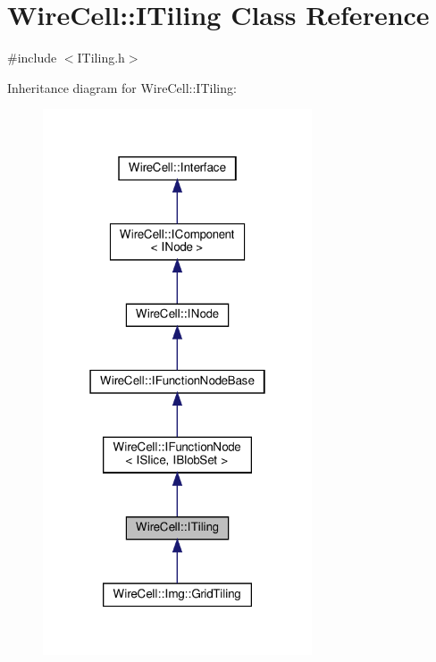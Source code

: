 \hypertarget{class_wire_cell_1_1_i_tiling}{}\section{Wire\+Cell\+:\+:I\+Tiling Class Reference}
\label{class_wire_cell_1_1_i_tiling}


{\ttfamily \#include $<$I\+Tiling.\+h$>$}



Inheritance diagram for Wire\+Cell\+:\+:I\+Tiling\+:
\nopagebreak
\begin{figure}[H]
\begin{center}
\leavevmode
\includegraphics[width=226pt]{class_wire_cell_1_1_i_tiling__inherit__graph}
\end{center}
\end{figure}


